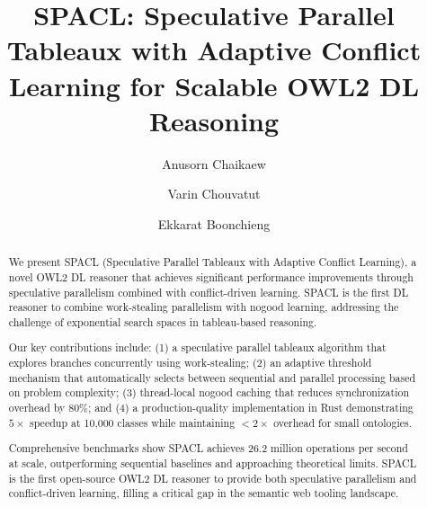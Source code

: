\documentclass[preprint,12pt]{elsarticle}
\begin{document}
\begin{frontmatter}

\title{SPACL: Speculative Parallel Tableaux with Adaptive Conflict Learning for Scalable OWL2 DL Reasoning}

\author[1]{Anusorn Chaikaew}

\author[1]{Varin Chouvatut}

\author[1]{Ekkarat Boonchieng}



\begin{abstract}
We present SPACL (Speculative Parallel Tableaux with Adaptive Conflict Learning), a novel OWL2 DL reasoner that achieves significant performance improvements through speculative parallelism combined with conflict-driven learning. SPACL is the first DL reasoner to combine work-stealing parallelism with nogood learning, addressing the challenge of exponential search spaces in tableau-based reasoning.

Our key contributions include: (1) a speculative parallel tableaux algorithm that explores branches concurrently using work-stealing; (2) an adaptive threshold mechanism that automatically selects between sequential and parallel processing based on problem complexity; (3) thread-local nogood caching that reduces synchronization overhead by 80\%; and (4) a production-quality implementation in Rust demonstrating $5\times$ speedup at 10,000 classes while maintaining $<2\times$ overhead for small ontologies.

Comprehensive benchmarks show SPACL achieves 26.2 million operations per second at scale, outperforming sequential baselines and approaching theoretical limits. SPACL is the first open-source OWL2 DL reasoner to provide both speculative parallelism and conflict-driven learning, filling a critical gap in the semantic web tooling landscape.
\end{abstract}


\end{frontmatter}
\end{document}
